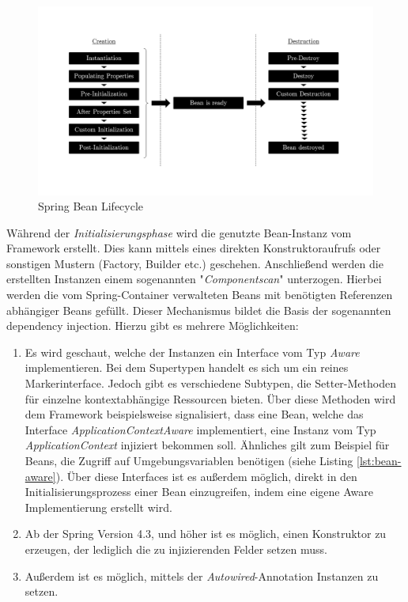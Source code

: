 \begin{figure}[ht!]
	\centering
	\includegraphics[width=\linewidth]{kapitel/ergebnisanalyse/_img/bean-lifecycle}
	\caption[Bean Lifecycle]{Spring Bean Lifecycle \cite{bean-lifecycle}}
	\label{fig:bean-init}
\end{figure}

Während der \emph{Initialisierungsphase} wird die genutzte Bean-Instanz vom Framework erstellt. Dies kann mittels eines direkten Konstruktoraufrufs oder sonstigen Mustern (Factory, Builder etc.) geschehen. Anschließend werden die erstellten Instanzen einem sogenannten "\emph{Componentscan}" unterzogen. Hierbei werden die vom Spring-Container verwalteten Beans mit benötigten Referenzen abhängiger Beans gefüllt. Dieser Mechanismus bildet die Basis der sogenannten dependency injection. Hierzu gibt es mehrere Möglichkeiten:

\begin{enumerate}

	\item Es wird geschaut, welche der Instanzen ein Interface vom Typ \emph{Aware} implementieren. Bei dem Supertypen handelt es sich um ein reines Markerinterface. Jedoch gibt es verschiedene Subtypen, die Setter-Methoden für einzelne kontextabhängige Ressourcen bieten. Über diese Methoden wird dem Framework beispielsweise signalisiert, dass eine Bean, welche das Interface \emph{ApplicationContextAware} implementiert, eine Instanz vom Typ \emph{ApplicationContext} injiziert bekommen soll. Ähnliches gilt zum Beispiel für Beans, die Zugriff auf Umgebungsvariablen benötigen (siehe Listing \ref{lst:bean-aware}). Über diese Interfaces ist es außerdem möglich, direkt in den Initialisierungsprozess einer Bean einzugreifen, indem eine eigene Aware Implementierung erstellt wird.

	\item Ab der Spring Version 4.3, und höher ist es möglich, einen Konstruktor zu erzeugen, der lediglich die zu injizierenden Felder setzen muss.

	\item Außerdem ist es möglich, mittels der \emph{Autowired}-Annotation Instanzen zu setzen.
	
\end{enumerate}

